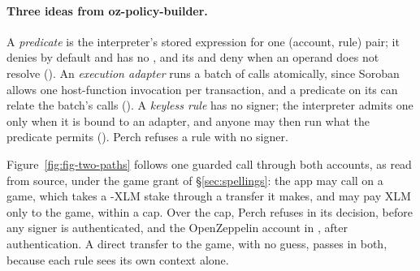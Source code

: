 \paragraph{Three ideas from oz-policy-builder.} A \emph{predicate} is the
interpreter's stored expression for one (account, rule) pair; it denies by
default and has no , and its  and  deny when an
operand does not resolve (). An
\emph{execution adapter} runs a batch of calls atomically, since Soroban allows
one host-function invocation per transaction, and a predicate on its
 can relate the batch's calls (). A
\emph{keyless rule} has no signer; the interpreter admits one only when it is
bound to an adapter, and anyone may then run what the predicate permits
(). Perch refuses a rule with no
signer.

Figure~\ref{fig:fig-two-paths} follows one guarded call through both accounts, as
read from source, under the game grant of \S\ref{sec:spellings}: the app may call
 on a game, which takes a -XLM stake
through a transfer it makes, and may pay XLM only to the game, within a cap. Over
the cap, Perch refuses in its decision, before any signer is authenticated, and
the OpenZeppelin account in , after authentication. A
direct transfer to the game, with no guess, passes in both, because each rule
sees its own context alone.

